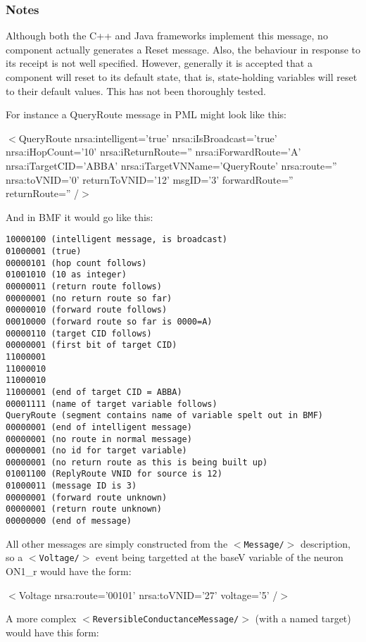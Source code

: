 \documentclass[pdftex,a4paper]{article}
\newcommand{\XML}[2][]{{\tt \small $<$#2#1/$>$}}
\newcommand{\XMLtext}[1]{
  \begin{tt}
    \begin{small}
      \begin{list}{}{
          \setlength{\topsep}{0pt}
          \setlength{\partopsep}{0pt}
          \setlength{\itemsep}{0pt}
          \setlength{\parsep}{0pt}
          \setlength{\leftmargin}{2em}
          \setlength{\rightmargin}{2em}
          \setlength{\labelsep}{0pt}
        }
      \item #1
      \end{list}
    \end{small}
  \end{tt}
}
\newcommand{\XMLsimple}[2][]{\XMLtext{$<$#2#1/$>$}}
\begin{document}
\subsubsection*{Notes}
Although both the C++ and Java frameworks implement this message, no component
actually generates a Reset message. Also, the behaviour in response to its
receipt is not well specified. However, generally it is accepted that a component will
reset to its default state, that is, state-holding variables will reset to their
default values. This has not been thoroughly tested.

\clearpage

For instance a QueryRoute message in PML might look like this:

\XMLsimple[ nrsa:intelligent='true' nrsa:iIsBroadcast='true'
  nrsa:iHopCount='10' nrsa:iReturnRoute='' nrsa:iForwardRoute='A'
  nrsa:iTargetCID='ABBA' nrsa:iTargetVNName='QueryRoute' nrsa:route=''
  nrsa:toVNID='0' returnToVNID='12' msgID='3'
  forwardRoute='' returnRoute='' ]{QueryRoute}

And in BMF it would go like this:

\begin{verbatim}
10000100 (intelligent message, is broadcast)
01000001 (true)
00000101 (hop count follows)
01001010 (10 as integer)
00000011 (return route follows)
00000001 (no return route so far)
00000010 (forward route follows)
00010000 (forward route so far is 0000=A)
00000110 (target CID follows)
00000001 (first bit of target CID)
11000001
11000010
11000010
11000001 (end of target CID = ABBA)
00001111 (name of target variable follows)
QueryRoute (segment contains name of variable spelt out in BMF)
00000001 (end of intelligent message)
00000001 (no route in normal message)
00000001 (no id for target variable)
00000001 (no return route as this is being built up)
01001100 (ReplyRoute VNID for source is 12)
01000011 (message ID is 3)
00000001 (forward route unknown)
00000001 (return route unknown)
00000000 (end of message)
\end{verbatim}

All other messages are simply constructed from the \XML{Message}
description, so a \XML{Voltage} event being targetted at the baseV
variable of the neuron ON1\_r would have the form:

\XMLsimple[ nrsa:route='00101' nrsa:toVNID='27' voltage='5' ]{Voltage}

A more complex \XML{ReversibleConductanceMessage} (with a named
target) would have this form:
\end{document}
